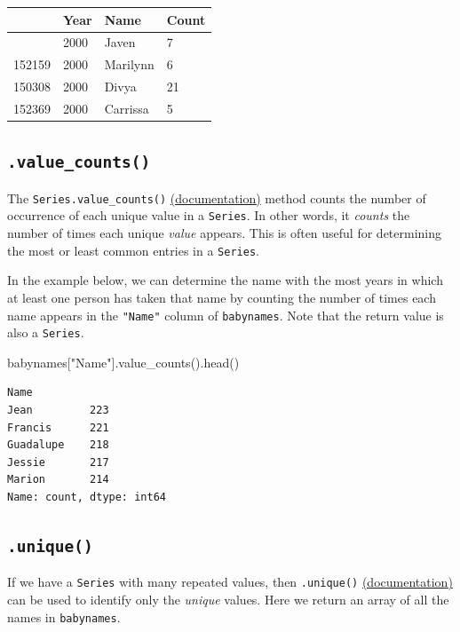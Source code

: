 \documentclass[
  letterpaper,
  DIV=11,
  numbers=noendperiod]{scrreprt}
\newenvironment{Shaded}{\begin{snugshade}}{\end{snugshade}}
\newcommand{\NormalTok}[1]{\textcolor[rgb]{0.00,0.23,0.31}{#1}}
\newcommand{\StringTok}[1]{\textcolor[rgb]{0.13,0.47,0.30}{#1}}
\begin{document}
\begin{longtable}[]{@{}llll@{}}
\toprule\noalign{}
& Year & Name & Count \\
\midrule\noalign{}
\endhead
\bottomrule\noalign{}
\endlastfoot
344251 & 2000 & Javen & 7 \\
152159 & 2000 & Marilynn & 6 \\
150308 & 2000 & Divya & 21 \\
152369 & 2000 & Carrissa & 5 \\
\end{longtable}

\subsection{\texorpdfstring{\texttt{.value\_counts()}}{.value\_counts()}}\label{value_counts}

The \texttt{Series.value\_counts()}
\href{https://pandas.pydata.org/docs/reference/api/pandas.Series.value_counts.html}{(documentation)}
method counts the number of occurrence of each unique value in a
\texttt{Series}. In other words, it \emph{counts} the number of times
each unique \emph{value} appears. This is often useful for determining
the most or least common entries in a \texttt{Series}.

In the example below, we can determine the name with the most years in
which at least one person has taken that name by counting the number of
times each name appears in the \texttt{"Name"} column of
\texttt{babynames}. Note that the return value is also a
\texttt{Series}.

\begin{Shaded}
\begin{Highlighting}[]
\NormalTok{babynames[}\StringTok{"Name"}\NormalTok{].value\_counts().head()}
\end{Highlighting}
\end{Shaded}

\begin{verbatim}
Name
Jean         223
Francis      221
Guadalupe    218
Jessie       217
Marion       214
Name: count, dtype: int64
\end{verbatim}

\subsection{\texorpdfstring{\texttt{.unique()}}{.unique()}}\label{unique}

If we have a \texttt{Series} with many repeated values, then
\texttt{.unique()}
\href{https://pandas.pydata.org/docs/reference/api/pandas.unique.html}{(documentation)}
can be used to identify only the \emph{unique} values. Here we return an
array of all the names in \texttt{babynames}.
\end{document}
